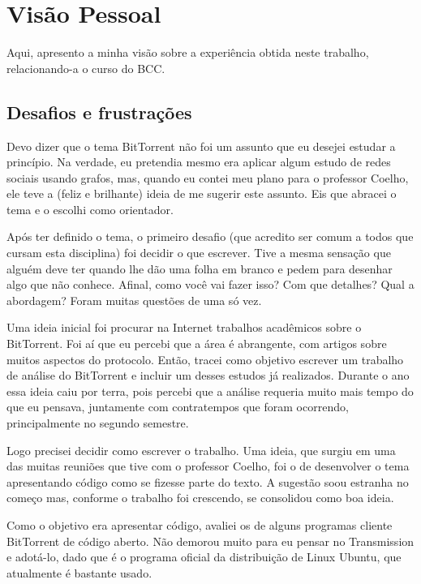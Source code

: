 
\chapter*{Visão Pessoal}

Aqui, apresento a minha visão sobre a experiência obtida neste trabalho, relacionando-a
o curso do BCC.

\section*{Desafios e frustrações}

Devo dizer que o tema BitTorrent não foi um assunto que eu desejei estudar a princípio.
Na verdade, eu pretendia mesmo era aplicar algum estudo de redes sociais usando grafos,
mas, quando eu contei meu plano para o professor Coelho, ele teve a (feliz e brilhante)
ideia de me sugerir este assunto. Eis que abracei o tema e o escolhi como orientador.

Após ter definido o tema, o primeiro desafio (que acredito ser comum a todos que cursam
esta disciplina) foi decidir o que escrever. Tive a mesma sensação que alguém deve ter
quando lhe dão uma folha em branco e pedem para desenhar algo que não conhece. Afinal,
como você vai fazer isso? Com que detalhes? Qual a abordagem? Foram muitas questões de
uma só vez.

Uma ideia inicial foi procurar na Internet trabalhos acadêmicos sobre o BitTorrent. Foi
aí que eu percebi que a área é abrangente, com artigos sobre muitos aspectos do
protocolo. Então, tracei como objetivo escrever um trabalho de análise do BitTorrent e
incluir um desses estudos já realizados. Durante o ano essa ideia caiu por terra,
pois percebi que a análise requeria muito mais tempo do que eu pensava, juntamente com
contratempos que foram ocorrendo, principalmente no segundo semestre.

Logo precisei decidir como escrever o trabalho. Uma ideia, que surgiu em uma das muitas
reuniões que tive com o professor Coelho, foi o de desenvolver o tema apresentando
código como se fizesse parte do texto. A sugestão soou estranha no começo mas, conforme
o trabalho foi crescendo, se consolidou como boa ideia.

Como o objetivo era apresentar código, avaliei os de alguns programas cliente
BitTorrent de código aberto. Não demorou muito para eu pensar no Transmission e
adotá-lo, dado que é o programa oficial da distribuição de Linux Ubuntu, que atualmente
é bastante usado.


